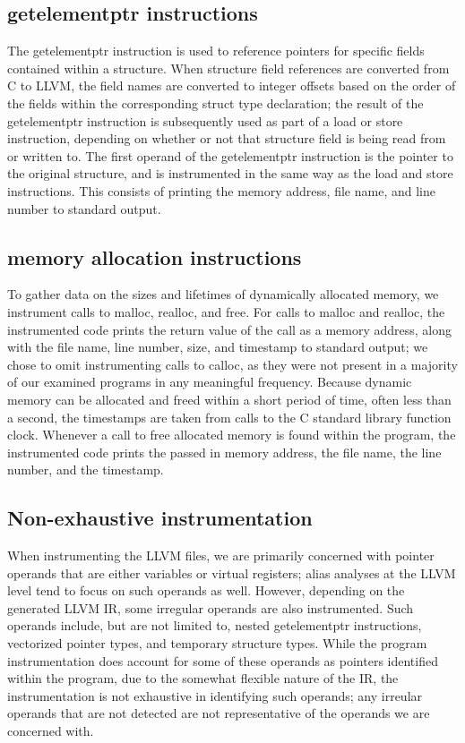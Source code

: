 \subsection{getelementptr instructions}
The getelementptr instruction is used to reference pointers for specific fields contained within a structure. When structure field references are converted from C to LLVM, the field names are converted to integer offsets based on the order of the fields within the corresponding struct type declaration; the result of the getelementptr instruction is subsequently used as part of a load or store instruction, depending on whether or not that structure field is being read from or written to. The first operand of the getelementptr instruction is the pointer to the original structure, and is instrumented in the same way as the load and store instructions. This consists of printing the memory address, file name, and line number to standard output.

\subsection{memory allocation instructions}
To gather data on the sizes and lifetimes of dynamically allocated memory, we instrument calls to malloc, realloc, and free. For calls to malloc and realloc, the instrumented code prints the return value of the call as a memory address, along with the file name, line number, size, and timestamp to standard output; we chose to omit instrumenting calls to calloc, as they were not present in a majority of our examined programs in any meaningful frequency. Because dynamic memory can be allocated and freed within a short period of time, often less than a second, the timestamps are taken from calls to the C standard library function clock. Whenever a call to free allocated memory is found within the program, the instrumented code prints the passed in memory address, the file name, the line number, and the timestamp.

\subsection{Non-exhaustive instrumentation}
When instrumenting the LLVM files, we are primarily concerned with pointer operands that are either variables or virtual registers; alias analyses at the LLVM level tend to focus on such operands as well. However, depending on the generated LLVM IR, some irregular operands are also instrumented. Such operands include, but are not limited to, nested getelementptr instructions, vectorized pointer types, and temporary structure types. While the program instrumentation does account for some of these operands as pointers identified within the program, due to the somewhat flexible nature of the IR, the instrumentation is not exhaustive in identifying such operands; any irreular operands that are not detected are not representative of the operands we are concerned with.
